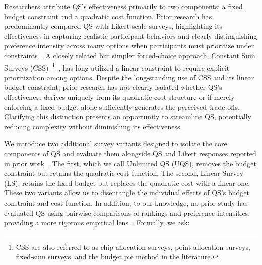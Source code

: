
Researchers attribute QS's effectiveness primarily to two components: a fixed budget constraint and a quadratic cost function. Prior research has predominantly compared QS with Likert scale surveys, highlighting its effectiveness in capturing realistic participant behaviors and clearly distinguishing preference intensity across many options when participants must prioritize under constraints~\cite{chengCanShowWhat2021, cavaille2024cares}. A closely related but simpler forced-choice approach, Constant Sum Surveys (CSS)~\footnote{CSS are also referred to as chip-allocation surveys, point-allocation surveys, fixed-sum surveys, and the budget pie method in the literature.}~\cite{metfesselProposalQuantitativeReporting1947}, has long utilized a linear constraint to require explicit prioritization among options. Despite the long-standing use of CSS and its linear budget constraint, prior research has not clearly isolated whether QS's effectiveness derives uniquely from its quadratic cost structure or if merely enforcing a fixed budget alone sufficiently generates the perceived trade-offs. Clarifying this distinction presents an opportunity to streamline QS, potentially reducing complexity without diminishing its effectiveness.


We introduce two additional survey variants designed to isolate the core components of QS and evaluate them alongside QS and Likert responses reported in prior work~\cite{chengCanShowWhat2021}. The first, which we call Unlimited QS (UQS), removes the budget constraint but retains the quadratic cost function. The second, Linear Survey (LS), retains the fixed budget but replaces the quadratic cost with a linear one. These two variants allow us to disentangle the individual effects of QS's budget constraint and cost function. In addition, to our knowledge, no prior study has evaluated QS using pairwise comparisons of rankings and preference intensities, providing a more rigorous empirical lens~\cite{collewet2023preference}. Formally, we ask:

